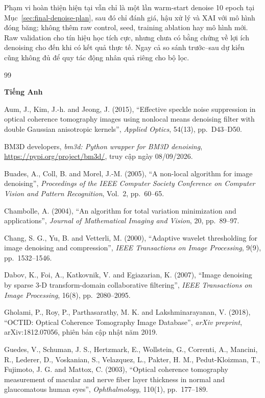 \documentclass[14pt,a4paper,oneside]{extreport}
\begin{document}
Phạm vi hoàn thiện hiện tại vẫn chỉ là một lần warm-start denoise
10 epoch tại Mục~\ref{sec:final-denoise-plan}, sau đó chỉ đánh giá,
hậu xử lý và XAI với mô hình đóng băng; không thêm raw control,
seed, training ablation hay mô hình mới. Raw validation cho tín
hiệu học tích cực, nhưng chưa có bằng chứng về lợi ích denoising
cho đến khi có kết quả thực tế. Ngay cả so sánh trước--sau dự kiến
cũng không đủ để quy tác động nhân quả riêng cho bộ lọc.

\clearpage
{}
{}
\begin{thebibliography}{99}
\RaggedRight
\item[]\textbf{Tiếng Anh}

Aum, J., Kim, J.-h. and Jeong, J. (2015), ``Effective speckle noise suppression
in optical coherence tomography images using nonlocal means denoising filter
with double Gaussian anisotropic kernels'', \textit{Applied Optics}, 54(13),
pp.~D43--D50.

BM3D developers, \textit{bm3d: Python wrapper for BM3D denoising},
\url{https://pypi.org/project/bm3d/}, truy cập ngày 08/09/2026.

Buades, A., Coll, B. and Morel, J.-M. (2005), ``A non-local algorithm for image
denoising'', \textit{Proceedings of the IEEE Computer Society Conference on
Computer Vision and Pattern Recognition}, Vol.~2, pp.~60--65.

Chambolle, A. (2004), ``An algorithm for total variation minimization and
applications'', \textit{Journal of Mathematical Imaging and Vision},
20, pp.~89--97.

Chang, S. G., Yu, B. and Vetterli, M. (2000), ``Adaptive wavelet thresholding
for image denoising and compression'', \textit{IEEE Transactions on Image
Processing}, 9(9), pp.~1532--1546.

Dabov, K., Foi, A., Katkovnik, V. and Egiazarian, K. (2007), ``Image denoising
by sparse 3-D transform-domain collaborative filtering'', \textit{IEEE
Transactions on Image Processing}, 16(8), pp.~2080--2095.

Gholami, P., Roy, P., Parthasarathy, M. K. and Lakshminarayanan, V.
(2018), ``OCTID: Optical Coherence Tomography Image Database'',
\textit{arXiv preprint}, arXiv:1812.07056,
phiên bản cập nhật năm 2019.

Guedes, V., Schuman, J. S., Hertzmark, E., Wollstein, G., Correnti, A.,
Mancini, R., Lederer, D., Voskanian, S., Velazquez, L., Pakter, H. M.,
Pedut-Kloizman, T., Fujimoto, J. G. and Mattox, C. (2003),
``Optical coherence tomography measurement of macular and nerve fiber
layer thickness in normal and glaucomatous human eyes'',
\textit{Ophthalmology}, 110(1), pp.~177--189.


\end{thebibliography}
\end{document}
